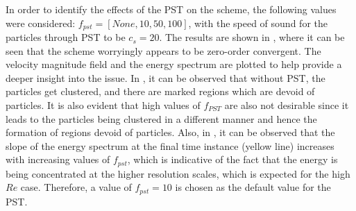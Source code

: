 In order to identify the effects of the PST on the scheme, the following values were considered: $f_{pst} = [None, 10, 50, 100]$, with the speed of sound for the particles through PST to be $c_s = 20$. The results are shown in , where it can be seen that the scheme worryingly appears to be zero-order convergent. The velocity magnitude field and the energy spectrum are plotted to help provide a deeper insight into the issue.
In , it can be observed that without PST, the particles get clustered, and there are marked regions which are devoid of particles. It is also evident that high values of $f_{PST}$ are also not desirable since it leads to the particles being clustered in a different manner and hence the formation of regions devoid of particles.
Also, in , it can be observed that the slope of the energy spectrum at the final time instance (yellow line) increases with increasing values of $f_{pst}$, which is indicative of the fact that the energy is being concentrated at the higher resolution scales, which is expected for the high $Re$ case.
Therefore, a value of $f_{pst} = 10$ is chosen as the default value for the PST.

